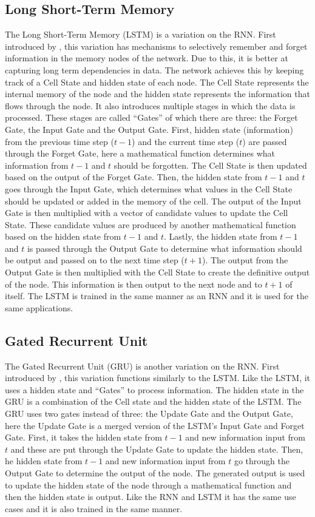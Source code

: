 \documentclass[conference]{IEEEtran}
\begin{document}
\subsection{Long Short-Term Memory} \label{LSTM}
The Long Short-Term Memory (LSTM) is a variation on the RNN. First introduced by \cite{hochreiter1997long}, this variation has mechanisms to selectively remember and forget information in the memory nodes of the network. Due to this, it is better at capturing long term dependencies in data. The network achieves this by keeping track of a Cell State and hidden state of each node. The Cell State represents the internal memory of the node and the hidden state represents the information that flows through the node. It also introduces multiple stages in which the data is processed. These stages are called ``Gates'' of which there are three: the Forget Gate, the Input Gate and the Output Gate. First, hidden state (information) from the previous time step ($t-1$) and the current time step ($t$) are passed through the Forget Gate, here a mathematical function determines what information from $t-1$ and $t$ should be forgotten. The Cell State is then updated based on the output of the Forget Gate. Then, the hidden state from $t-1$ and $t$ goes through the Input Gate, which determines what values in the Cell State should be updated or added in the memory of the cell. The output of the Input Gate is then multiplied with a vector of candidate values to update the Cell State. These candidate values are produced by another mathematical function based on the hidden state from $t-1$ and $t$. Lastly, the hidden state from $t-1$ and $t$ is passed through the Output Gate to determine what information should be output and passed on to the next time step ($t+1$). The output from the Output Gate is then multiplied with the Cell State to create the definitive output of the node. This information is then output to the next node and to $t+1$ of itself. The LSTM is trained in the same manner as an RNN and it is used for the same applications.

\subsection{Gated Recurrent Unit} \label{GRU}
The Gated Recurrent Unit (GRU) is another variation on the RNN. First introduced by \cite{chung2014empirical}, this variation functions similarly to the LSTM. Like the LSTM, it uses a hidden state and ``Gates'' to process information. The hidden state in the GRU is a combination of the Cell state and the hidden state of the LSTM. The GRU uses two gates instead of three: the Update Gate and the Output Gate, here the Update Gate is a merged version of the LSTM's Input Gate and Forget Gate. First, it takes the hidden state from $t-1$ and new information input from $t$ and these are put through the Update Gate to update the hidden state. Then, he hidden state from $t-1$ and new information input from $t$ go through the Output Gate to determine the output of the node. The generated output is used to update the hidden state of the node through a mathematical function and then the hidden state is output. Like the RNN and LSTM it has the same use cases and it is also trained in the same manner.
\end{document}
